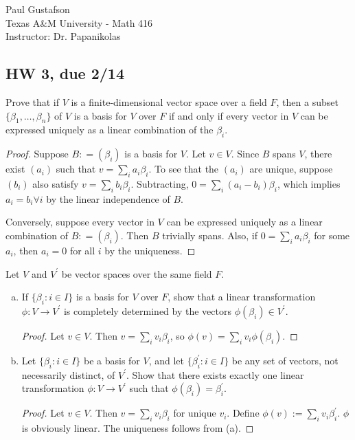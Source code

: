 \documentclass{article}
\begin{document}
\noindent Paul Gustafson\\
\noindent Texas A\&M University - Math 416\\
\noindent Instructor: Dr. Papanikolas

\subsection*{HW 3, due 2/14}

 Prove that if $V$ is a finite-dimensional vector space over a field $F$, then a subset $\{\beta_1, \ldots, \beta_n\}$ of $V$ is a basis for $V$ over $F$ if and only if every vector in $V$ can be expressed uniquely as a linear combination of the $\beta_i$.
\begin{proof}
Suppose $B : = (\beta_i)$ is a basis for $V$. Let $v \in V$. Since $B$ spans $V$, there exist $(a_i)$ such that $v = \sum_i a_i \beta_i$. To see that the $(a_i)$ are unique, suppose $(b_i)$ also satisfy $v =\sum_i b_i \beta_i$. Subtracting,
$0 = \sum_i (a_i - b_i) \beta_i$, which implies $a_i = b_i \forall i$ by the linear independence of $B$.

Conversely, suppose every vector in $V$ can be expressed uniquely as a linear combination of $B: = (\beta_i)$. Then $B$ trivially spans. Also, if $0 = \sum_i a_i \beta_i$ for some $a_i$, then $a_i = 0$ for all $i$ by the uniqueness.
\end{proof}
 Let $V$ and $V^\prime$ be vector spaces over the same field $F$. 
\begin{enumerate}[a.]
\item If $\{\beta_i : i\in I\}$ is a basis for $V$ over $F$, show that a linear transformation $\phi:V\to V^\prime$ is completely determined by the vectors $\phi(\beta_i) \in V^\prime$.
\begin{proof}
Let $v \in V$. Then $v = \sum_i v_i \beta_i$, so $\phi(v) = \sum_i v_i \phi(\beta_i)$.
\end{proof}
\item Let $\{\beta_i : i \in I\}$ be a basis for $V$, and let $\{\beta_i^\prime : i \in I\}$ be any set of vectors, not necessarily distinct, of $V^\prime$. Show that there exists exactly one linear transformation $\phi:V\to V^\prime$ such that $\phi(\beta_i) = \beta_i^\prime$.
\begin{proof}
Let $v \in V$. Then $v = \sum_i v_i \beta_i$ for unique $v_i$. Define $\phi(v):= \sum_i v_i \beta_i^\prime$. $\phi$ is obviously linear. The uniqueness follows from (a).
\end{proof}
\end{enumerate}
\end{document}
